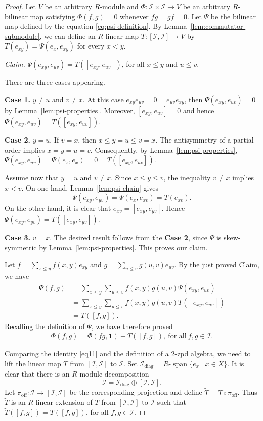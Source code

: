 \documentclass[reqno]{amsart}
\numberwithin{equation}{section}
\theoremstyle{plain}
\theoremstyle{definition}
\newcommand{\I}{\mathcal I}
\newcommand{\one}{\mathbf 1}
\newcommand{\Span}{\operatorname{span}}
\begin{document}
\begin{proof}
Let $V$ be an arbitrary $R$-module and
$\Phi:\I\times\I\to V$ be an arbitrary $R$-bilinear map satisfying
$\Phi(f,g)=0$ whenever $fg=gf=0$. Let $\Psi$ be the bilinear map
defined by the equation \eqref{eq:psi-definition}. By Lemma~\ref{lem:commutator-submodule}, we can
define an $R$-linear map $T:[\I,\I]\to V$ by
$T(e_{xy})=\Psi(e_x,e_{xy})$ for every $x<y$.

\smallskip
\noindent\emph{Claim.}
$\Psi(e_{xy},e_{uv})=T([e_{xy},e_{uv}])$, for all $x\leq y$ and  $u\leq v$.

There are three cases appearing.

{\bf Case 1.} $y\neq u$ and $v\neq x$.
At this case $e_{xy}e_{uv}=0=e_{uv}e_{xy}$, then $\Psi(e_{xy},e_{uv})=0$ by Lemma~\ref{lem:psi-properties}.
Moreover, $[e_{xy},e_{uv}]=0$ and hence
$\Psi(e_{xy},e_{uv})=T([e_{xy},e_{uv}])$.

{\bf Case 2.} $y=u$. If $v=x$, then
$x\leq y=u\leq v=x$. The antisymmetry of a partial order implies
$x=y=u=v$. Consequently, by Lemma~\ref{lem:psi-properties},
$\Psi(e_{xy},e_{uv})=\Psi(e_x,e_x)=0=T([e_{xy},e_{uv}])$.

Assume now that $y=u$ and $v\neq x$. Since
$x\leq y\leq v$, the inequality $v\neq x$ implies $x<v$.
On one hand, Lemma~\ref{lem:psi-chain} gives
\[
\Psi(e_{xy},e_{yv})=\Psi(e_x,e_{xv})=T(e_{xv}).
\]
On the other hand, it is clear that $e_{xv}=[e_{xy},e_{yv}]$. Hence
$\Psi(e_{xy},e_{yv})=T([e_{xy},e_{yv}])$.

{\bf Case 3.} $v=x$.
The desired result follows from the {\bf Case 2}, since $\Psi$
is skew-symmetric by Lemma~\ref{lem:psi-properties}.
This proves our claim.

Let $f=\sum_{x\leq y}f(x,y)e_{xy}$ and $g=\sum_{u\leq v}g(u,v)e_{uv}$.
By the just proved Claim, we have
\[
\begin{aligned}
\Psi(f,g)
&=\sum_{x\leq y}\sum_{u\leq v}
  f(x,y)g(u,v)\Psi(e_{xy},e_{uv})\\
&=\sum_{x\leq y}\sum_{u\leq v}
  f(x,y)g(u,v)T([e_{xy},e_{uv}])\\
&=T([f,g]).
\end{aligned}
\]
Recalling the definition of $\Psi$, we have therefore proved
\begin{align}\label{eq11}
\Phi(f,g)=\Phi(fg,\one)+T([f,g]),~\text{for~all}~f,g\in\I.
\end{align}

Comparing the identity \eqref{eq11} and the definition of a $2$-zpd algebra, we need to lift the
linear map $T$ from $[\I,\I]$ to $\I$. Set $\I_{\mathrm{diag}}=R$-$\Span\{e_x \mid x\in X\}$.
It is clear that there is an $R$-module decomposition
\[
\I=\I_{\mathrm{diag}}\oplus[\I,\I].
\]
Let $\pi_{\mathrm{off}}:\I\to[\I,\I]$ be the corresponding
projection and define $\widetilde T=T\circ\pi_{\mathrm{off}}$.
Thus $\widetilde T$ is an $R$-linear extension of $T$ from
$[\I,\I]$ to $\I$ such that $\widetilde T([f,g])=T([f,g])$, for all $f,g\in \I$.


\end{proof}
\end{document}
